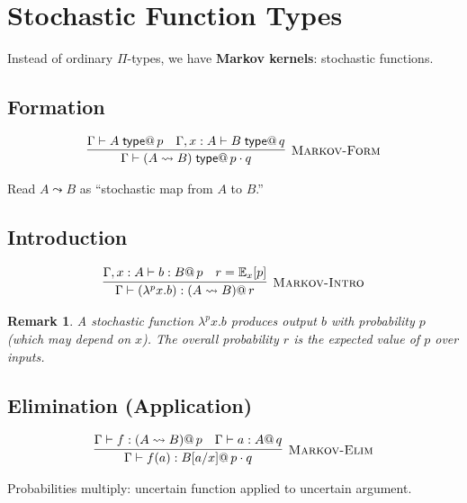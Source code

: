 \documentclass[11pt,a4paper]{article}
\makeatletter
\newtheorem{remark}{Remark}[section]
\newcommand{\type}{\;\mathsf{type}}
\newcommand{\E}{\mathbb{E}}
\newcommand{\pmark}[1]{@\, #1}  %
\makeatother
\begin{document}
\section{Stochastic Function Types}

Instead of ordinary $\Pi$-types, we have \textbf{Markov kernels}: stochastic functions.

\subsection{Formation}

\begin{gather}
\infer[\textsc{Markov-Form}]
  {\Gamma \vdash (A \leadsto B) \type \pmark{p \cdot q}}
  {\Gamma \vdash A \type \pmark{p} & \Gamma, x : A \vdash B \type \pmark{q}}
\end{gather}

Read $A \leadsto B$ as ``stochastic map from $A$ to $B$.''

\subsection{Introduction}

\begin{gather}
\infer[\textsc{Markov-Intro}]
  {\Gamma \vdash (\lambda^p x. b) : (A \leadsto B) \pmark{r}}
  {\Gamma, x : A \vdash b : B \pmark{p} & r = \E_x[p]}
\end{gather}

\begin{remark}
A stochastic function $\lambda^p x. b$ produces output $b$ with probability $p$ (which may depend on $x$). The overall probability $r$ is the expected value of $p$ over inputs.
\end{remark}

\subsection{Elimination (Application)}

\begin{gather}
\infer[\textsc{Markov-Elim}]
  {\Gamma \vdash f(a) : B[a/x] \pmark{p \cdot q}}
  {\Gamma \vdash f : (A \leadsto B) \pmark{p} & \Gamma \vdash a : A \pmark{q}}
\end{gather}

Probabilities multiply: uncertain function applied to uncertain argument.
\end{document}
